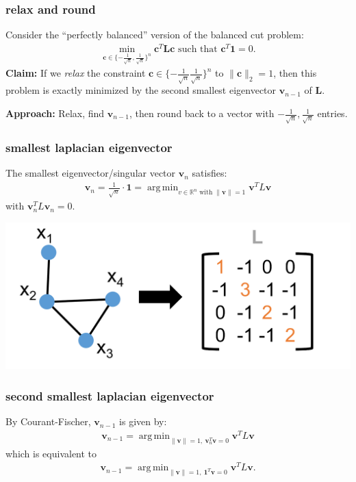 \documentclass[compress]{beamer}
\newcommand{\bv}[1]{\mathbf{#1}}
\newcommand{\R}{\mathbb{R}}
\DeclareMathOperator*{\argmin}{arg\,min}
\newcommand{\norm}[1]{\|#1\|}
\begin{document}
\begin{frame}
	\frametitle{relax and round}
	Consider the ``perfectly balanced'' version of the balanced cut problem:
	\begin{align*}
		\min_{\bv{c} \in \{-\frac{1}{\sqrt{n}},\frac{1}{\sqrt{n}}\}^n} \bv{c}^T\bv{L}\bv{c} \text{ such that } \bv{c}^T\bv{1} = 0.
	\end{align*}
	\textbf{Claim:} If we \emph{relax} the constraint $\bv{c} \in \{-\frac{1}{\sqrt{n}}\frac{1}{\sqrt{n}}\}^n$ to $\|\bv{c}\|_2 = 1$, then this problem is exactly minimized by the second smallest eigenvector $\bv{v}_{n-1}$ of $\bv{L}$. 

	\textbf{Approach:} Relax, find $\bv{v}_{n-1}$, then round back to a vector with $-\frac{1}{\sqrt{n}},\frac{1}{\sqrt{n}}$ entries.
\end{frame}




\begin{frame}[t]
	\frametitle{smallest laplacian eigenvector}
	The smallest eigenvector/singular vector $\bv{v}_n$ satisfies:
	\begin{align*}
	\bv{v}_n = \frac{1}{\sqrt{n}} \cdot \bv{1} = \argmin_{v \in \R^n\text{ with } \norm{\bv{v}} = 1} \bv{v}^T L \bv{v}
	\end{align*}
	with $\bv{v}_n^T  L \bv{v}_n = 0$. 
	
	\includegraphics[width=.5\textwidth]{laplace_compact.png}
\end{frame}

\begin{frame}
	\frametitle{second smallest laplacian eigenvector}
	By Courant-Fischer, $\bv{v}_{n-1}$ is given by:
	\begin{align*}
	\bv{v}_{n-1} = \argmin_{\norm{\bv{v}} = 1,\ {\bv{v}_n^T \bv{v} = 0}} \bv{v}^T L \bv{v}
	\end{align*}
	which is equivalent to
	\begin{align*}
		\bv{v}_{n-1} = \argmin_{\norm{\bv{v}} = 1,\ {\bv{1}^T \bv{v} = 0}} \bv{v}^T L \bv{v}.
	\end{align*}
\end{frame}
\end{document}
